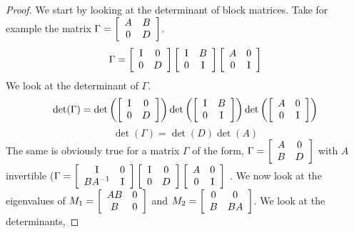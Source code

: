 \documentclass{article}
\begin{document}
\begin{enumerate}
\begin{proof}
    We start by looking at the determinant of block matrices. Take for example the matrix $\Gamma = \left[\begin{array}{c c} A & B \\ 0 & D\end{array}\right]$.
    \[
        \Gamma = \left[\begin{array}{c c} \mathrm{I} & 0 \\ 0 & D \end{array}\right]\left[\begin{array}{c c} \mathrm{I} & B \\ 0 & \mathrm{I} \end{array}\right] \left[\begin{array}{c c} A & 0 \\ 0 & \mathrm{I}\end{array}\right]
    \]
    We look at the determinant of $\Gamma$. 
    \[
        \det(\Gamma) = \det\left(\left[\begin{array}{c c} \mathrm{I} & 0 \\ 0 & D \end{array}\right]\right)\det\left(\left[\begin{array}{c c} \mathrm{I} & B \\ 0 & \mathrm{I} \end{array}\right]\right)\det\left(\left[\begin{array}{c c} A & 0 \\ 0 & \mathrm{I} \end{array}\right]\right)
    \] 
    \[
        \det(\Gamma) = \det(D)\det(A)
    \]
    The same is obviously true for a matrix $\Gamma$ of the form, $\Gamma = \left[\begin{array}{c c} A & 0 \\ B & D\end{array}\right]$ with $A$ invertible ($\Gamma = \left[\begin{array}{c c} \mathrm{I} & 0 \\ BA^{-1} & \mathrm{I} \end{array}\right]\left[\begin{array}{c c} \mathrm{I} & 0 \\ 0 & D \end{array}\right] \left[\begin{array}{c c} A & 0 \\ 0 & \mathrm{I}\end{array}\right]$
. We now look at the eigenvalues of $M_1 = \left[\begin{array}{c c} AB & 0 \\ B & 0\end{array}\right]$ and $M_2 = \left[\begin{array}{c c} 0 & 0 \\ B & BA \end{array}\right]$. We look at the determinants, 

\end{proof}
\end{enumerate}
\end{document}

